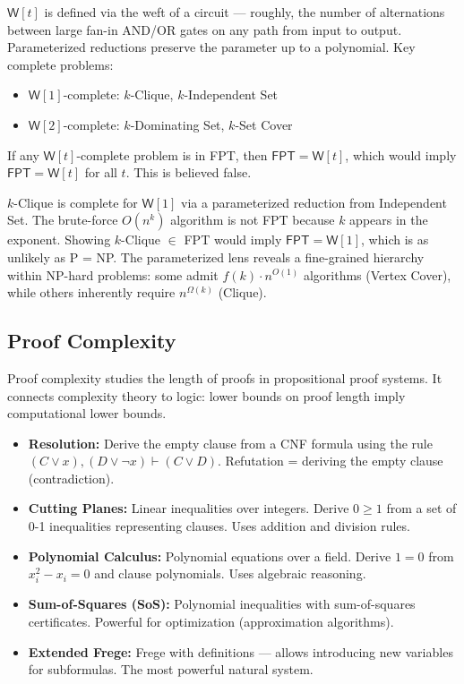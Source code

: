 \begin{definition}[W-hierarchy]
$\mathsf{W}[t]$ is defined via the weft of a circuit — roughly, the number of alternations between large fan-in AND/OR gates on any path from input to output. Parameterized reductions preserve the parameter up to a polynomial. Key complete problems:
\begin{itemize}
\item $\mathsf{W}[1]$-complete: $k$-Clique, $k$-Independent Set
\item $\mathsf{W}[2]$-complete: $k$-Dominating Set, $k$-Set Cover
\end{itemize}
If any $\mathsf{W}[t]$-complete problem is in FPT, then $\mathsf{FPT} = \mathsf{W}[t]$, which would imply $\mathsf{FPT} = \mathsf{W}[t]$ for all $t$. This is believed false.
\end{definition}

\begin{example}
$k$-Clique is complete for $\mathsf{W}[1]$ via a parameterized reduction from Independent Set. The brute-force $O(n^k)$ algorithm is not FPT because $k$ appears in the exponent. Showing $k$-Clique $\in$ FPT would imply $\mathsf{FPT} = \mathsf{W}[1]$, which is as unlikely as P = NP. The parameterized lens reveals a fine-grained hierarchy within NP-hard problems: some admit $f(k) \cdot n^{O(1)}$ algorithms (Vertex Cover), while others inherently require $n^{\Omega(k)}$ (Clique).
\end{example}

\subsection{Proof Complexity}
\label{sec:complexity:proof}

Proof complexity studies the length of proofs in propositional proof systems. It connects complexity theory to logic: lower bounds on proof length imply computational lower bounds.

\begin{definition}
\begin{itemize}
\item \textbf{Resolution:} Derive the empty clause from a CNF formula using the rule $(C \lor x), (D \lor \lnot x) \vdash (C \lor D)$. Refutation = deriving the empty clause (contradiction).
\item \textbf{Cutting Planes:} Linear inequalities over integers. Derive $0 \ge 1$ from a set of 0-1 inequalities representing clauses. Uses addition and division rules.
\item \textbf{Polynomial Calculus:} Polynomial equations over a field. Derive $1 = 0$ from $x_i^2 - x_i = 0$ and clause polynomials. Uses algebraic reasoning.
\item \textbf{Sum-of-Squares (SoS):} Polynomial inequalities with sum-of-squares certificates. Powerful for optimization (approximation algorithms).
\item \textbf{Extended Frege:} Frege with definitions — allows introducing new variables for subformulas. The most powerful natural system.
\end{itemize}
\end{definition}


